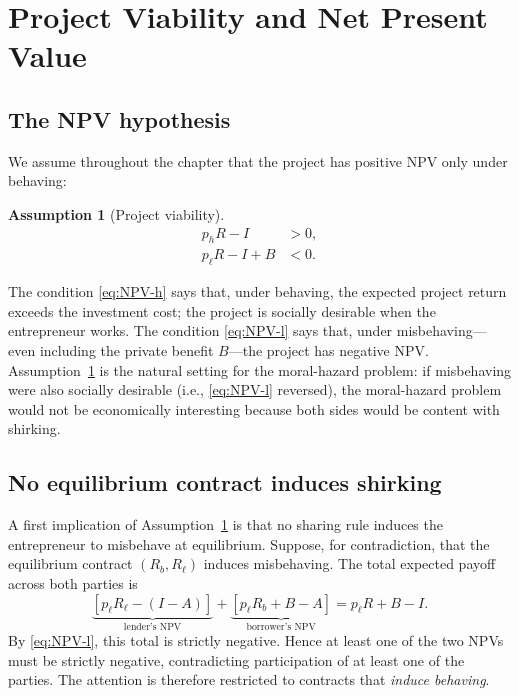 \documentclass[11pt,a4paper,oneside]{book}
\theoremstyle{plain}
\theoremstyle{definition}
\newtheorem{assumption}[theorem]{Assumption}
\theoremstyle{remark}
\numberwithin{equation}{chapter}
\begin{document}
\section{Project Viability and Net Present Value}
\label{sec:HT-viability}

\subsection{The NPV hypothesis}

We assume throughout the chapter that the project has positive NPV only under behaving:
\begin{assumption}[Project viability]\label{ass:HT-viability}
\begin{align}
  p_h R - I &> 0, \tag{V.1}\label{eq:NPV-h} \\
  p_\ell R - I + B &< 0. \tag{V.2}\label{eq:NPV-l}
\end{align}
\end{assumption}

The condition \eqref{eq:NPV-h} says that, under behaving, the expected project return exceeds the investment cost; the project is socially desirable when the entrepreneur works.
The condition \eqref{eq:NPV-l} says that, under misbehaving---even including the private benefit $B$---the project has negative NPV.
Assumption~\ref{ass:HT-viability} is the natural setting for the moral-hazard problem: if misbehaving were also socially desirable (i.e., \eqref{eq:NPV-l} reversed), the moral-hazard problem would not be economically interesting because both sides would be content with shirking.

\subsection{No equilibrium contract induces shirking}

A first implication of Assumption~\ref{ass:HT-viability} is that no sharing rule induces the entrepreneur to misbehave at equilibrium.
Suppose, for contradiction, that the equilibrium contract $(R_b, R_\ell)$ induces misbehaving.
The total expected payoff across both parties is
\begin{equation*}
  \underbrace{[p_\ell R_\ell - (I - A)]}_{\text{lender's NPV}} + \underbrace{[p_\ell R_b + B - A]}_{\text{borrower's NPV}}
  = p_\ell R + B - I.
\end{equation*}
By \eqref{eq:NPV-l}, this total is strictly negative.
Hence at least one of the two NPVs must be strictly negative, contradicting participation of at least one of the parties.
The attention is therefore restricted to contracts that \emph{induce behaving}.
\end{document}
